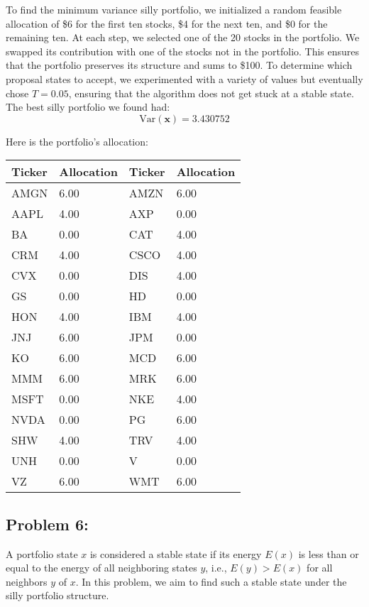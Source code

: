 \documentclass{report}
\begin{document}
To find the minimum variance silly portfolio, we initialized a random feasible allocation of \$6 for the first ten stocks, \$4 for the next ten, and \$0 for the remaining ten. At each step, we selected one of the 20 stocks in the portfolio. We swapped its contribution with one of the stocks not in the portfolio. This ensures that the portfolio preserves its structure and sums to \$100. To determine which proposal states to accept, we experimented with a variety of values but eventually chose $T = 0.05$, ensuring that the algorithm does not get stuck at a stable state. \\

The best silly portfolio we found had:
\[
\text{Var}(\mathbf{x}) = 3.430752
\]

Here is the portfolio's allocation:
\begin{center}
\begin{tabular}{ll|ll} 
\toprule 
\textbf{Ticker} & \textbf{Allocation} & \textbf{Ticker} & \textbf{Allocation} \\
\midrule 
AMGN & 6.00 & AMZN & 6.00 \\
AAPL & 4.00 & AXP & 0.00 \\
BA & 0.00 & CAT & 4.00 \\
CRM & 4.00 & CSCO & 4.00 \\
CVX & 0.00 & DIS & 4.00 \\
GS & 0.00 & HD & 0.00 \\
HON & 4.00 & IBM & 4.00 \\
JNJ & 6.00 & JPM & 0.00 \\
KO & 6.00 & MCD & 6.00 \\
MMM & 6.00 & MRK & 6.00 \\
MSFT & 0.00 & NKE & 4.00 \\
NVDA & 0.00 & PG & 6.00 \\
SHW & 4.00 & TRV & 4.00 \\
UNH & 0.00 & V & 0.00 \\
VZ & 6.00 & WMT & 6.00 \\
\bottomrule
\end{tabular}
\end{center}


\pagebreak


\subsection*{Problem 6:}
A portfolio state \( x \) is considered a stable state if its energy \( E(x) \) is less than or equal to the energy of all neighboring states \( y \), i.e., \( E(y) > E(x) \) for all neighbors \( y \) of \( x \). In this problem, we aim to find such a stable state under the silly portfolio structure. \\
\end{document}
